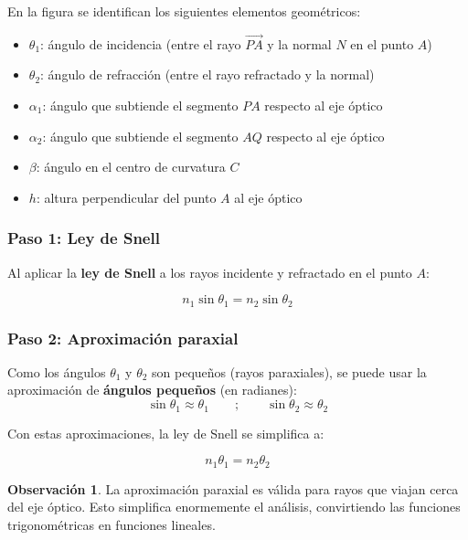 \documentclass[12pt, a4paper]{article}
\theoremstyle{definition}
\newtheorem{observacion}{Observación}[section]
\begin{document}
En la figura se identifican los siguientes elementos geométricos:
\begin{itemize}
  \item \(\theta_1\): ángulo de incidencia (entre el rayo \(\overrightarrow{PA}\) y la
        normal \(N\) en el punto \(A\))
  \item \(\theta_2\): ángulo de refracción (entre el rayo refractado y la normal)
  \item \(\alpha_1\): ángulo que subtiende el segmento \(PA\) respecto al eje óptico
  \item \(\alpha_2\): ángulo que subtiende el segmento \(AQ\) respecto al eje óptico
  \item \(\beta\): ángulo en el centro de curvatura \(C\)
  \item \(h\): altura perpendicular del punto \(A\) al eje óptico
\end{itemize}

\subsubsection*{Paso 1: Ley de Snell}

Al aplicar la \textbf{ley de Snell} a los rayos incidente y refractado en el punto \(A\):

\begin{equation}
  n_1 \sin\theta_1 = n_2 \sin\theta_2
  \label{eq:snell}
\end{equation}

\subsubsection*{Paso 2: Aproximación paraxial}

Como los ángulos \(\theta_1\) y \(\theta_2\) son pequeños (rayos paraxiales), se puede
usar la aproximación de \textbf{ángulos pequeños} (en radianes):
\[
  \sin\theta_1 \approx \theta_1 \qquad;\qquad \sin\theta_2 \approx \theta_2
\]

Con estas aproximaciones, la ley de Snell se simplifica a:

\begin{equation}
  n_1 \theta_1 = n_2 \theta_2
  \label{eq:snell_paraxial}
\end{equation}

\begin{observacion}
La aproximación paraxial es válida para rayos que viajan cerca del eje óptico. Esto
simplifica enormemente el análisis, convirtiendo las funciones trigonométricas en funciones
lineales.
\end{observacion}
\end{document}
